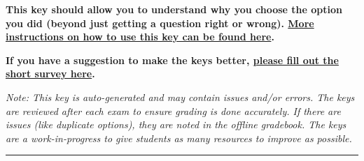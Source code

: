 \documentclass{extbook}[14pt]
\begin{document}
\textbf{This key should allow you to understand why you choose the option you did (beyond just getting a question right or wrong). \href{https://xronos.clas.ufl.edu/mac1105spring2020/courseDescriptionAndMisc/Exams/LearningFromResults}{More instructions on how to use this key can be found here}.}

\textbf{If you have a suggestion to make the keys better, \href{https://forms.gle/CZkbZmPbC9XALEE88}{please fill out the short survey here}.}

\textit{Note: This key is auto-generated and may contain issues and/or errors. The keys are reviewed after each exam to ensure grading is done accurately. If there are issues (like duplicate options), they are noted in the offline gradebook. The keys are a work-in-progress to give students as many resources to improve as possible.}

\rule{\textwidth}{0.4pt}

\begin{enumerate}\end{enumerate}
\end{document}
